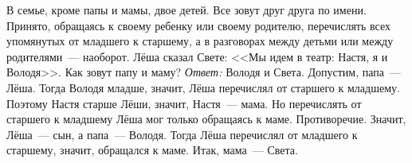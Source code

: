 \problem{}
В семье, кроме папы и мамы, двое детей.
Все зовут друг друга по имени.
Принято, обращаясь к своему ребенку или своему родителю, перечислять всех
упомянутых от младшего к старшему,
а в разговорах между детьми или между родителями~--- наоборот.
Лёша сказал Свете: <<Мы идем в театр: Настя, я и Володя>>.
Как зовут папу и маму?
\solution
\emph{Ответ:} Володя и Света.
Допустим, папа~--- Лёша.
Тогда Володя младше, значит, Лёша перечислял от старшего к младшему.
Поэтому Настя старше Лёши, значит, Настя~--- мама.
Но перечислять от старшего к младшему Лёша мог только обращаясь к маме.
Противоречие. 
Значит, Лёша~--- сын, а папа~--- Володя.
Тогда Лёша перечислял от младшего к старшему, значит, обращался к маме.
Итак, мама~--- Света.
\endproblem
